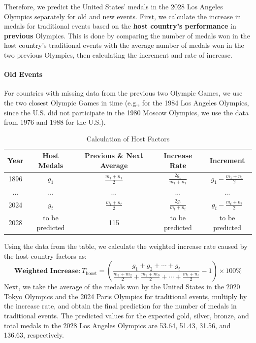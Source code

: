 \documentclass{mcmthesis}  %
\begin{document}
Therefore, we predict the United States' medals in the 2028 Los Angeles Olympics separately for old and new events. First, we calculate the increase in medals for traditional events based on the \textbf{host country's performance} in \textbf{previous} Olympics. This is done by comparing the number of medals won in the host country’s traditional events with the average number of medals won in the two previous Olympics, then calculating the increment and rate of increase.

\paragraph{Old Events}
For countries with missing data from the previous two Olympic Games, we use the two closest Olympic Games in time (e.g., for the 1984 Los Angeles Olympics, since the U.S. did not participate in the 1980 Moscow Olympics, we use the data from 1976 and 1988 for the U.S.).

\begin{table}[ht]
\centering
\begin{tabular}{|c|c|c|c|c|}
\hline
\textbf{Year} & \textbf{Host Medals} & \textbf{ Previous \& Next Average} & \textbf{Increase Rate} & \textbf{Increment} \\ \hline
1896 & $g_1$ & $\frac{m_1 + n_1}{2}$ & $\frac{2g_1}{m_1+n_1}$ & $g_1 - \frac{m_1 + n_1}{2}$ \\ \hline
... & ... & ... & ... & ... \\ \hline
2024 & $g_t$ & $\frac{m_t + n_t}{2}$ & $\frac{2g_t}{m_t+n_t}$ & $g_t - \frac{m_t + n_t}{2}$ \\ \hline
2028 & to be predicted& 115& to be predicted& to be predicted\\ \hline
\end{tabular}
\caption{Calculation of Host Factors}
\end{table}

Using the data from the table, we calculate the weighted increase rate caused by the host country factors as:
\[
\textbf{Weighted Increase}: T_{\text{boost}} = \left( \frac{g_1 + g_2 + \cdots + g_t}{\frac{m_1 + m_2}{2} + \frac{m_2 + m_3}{2} + \cdots + \frac{m_t + n_t}{2}} - 1 \right) \times 100\%
\]
Next, we take the average of the medals won by the United States in the 2020 Tokyo Olympics and the 2024 Paris Olympics for traditional events, multiply by the increase rate, and obtain the final prediction for the number of medals in traditional events. The predicted values for the expected gold, silver, bronze, and total medals in the 2028 Los Angeles Olympics are 53.64, 51.43, 31.56, and 136.63, respectively.
\end{document}
